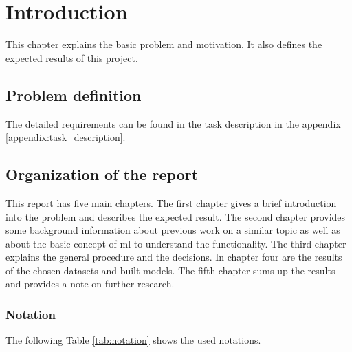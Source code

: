 \chapter{Introduction}
This chapter explains the basic problem and motivation. It also defines the expected results of this project.

\section{Problem definition}



The detailed requirements can be found in the task description in the appendix \ref{appendix:task_description}.

\newpage

\section{Organization of the report}
This report has five main chapters. The first chapter gives a brief introduction into the problem and describes the expected result. The second chapter provides some background information about previous work on a similar topic as well as about the basic concept of \gls{ml} to understand the functionality. The third chapter explains the general procedure and the decisions. In chapter four are the results of the chosen datasets and built models. The fifth chapter sums up the results and provides a note on further research. %

\subsection{Notation}
The following Table \ref{tab:notation} shows the used notations.

